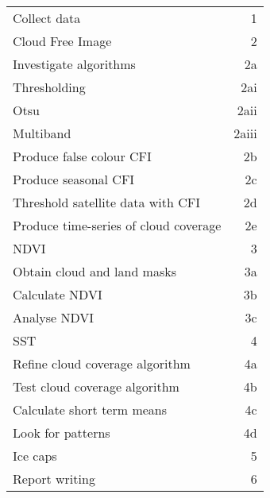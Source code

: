 \documentclass[12pt,preprint]{article}
\begin{document}
\begin{center}
\begin{tabular}{lr}
Collect data & 1 \\
Cloud Free Image & 2\\
Investigate algorithms & 2a\\
Thresholding & 2ai\\
Otsu & 2aii\\
Multiband & 2aiii\\
Produce false colour CFI & 2b\\
Produce seasonal CFI & 2c\\
Threshold satellite data with CFI & 2d\\
Produce time-series of cloud coverage & 2e\\
NDVI & 3\\
Obtain cloud and land masks & 3a\\
Calculate NDVI & 3b\\
Analyse NDVI & 3c\\
SST & 4\\
Refine cloud coverage algorithm & 4a\\
Test cloud coverage algorithm & 4b\\
Calculate short term means & 4c\\
Look for patterns & 4d\\
Ice caps & 5 \\
Report writing & 6\\
\end{tabular}
\end{center}
\end{document}
